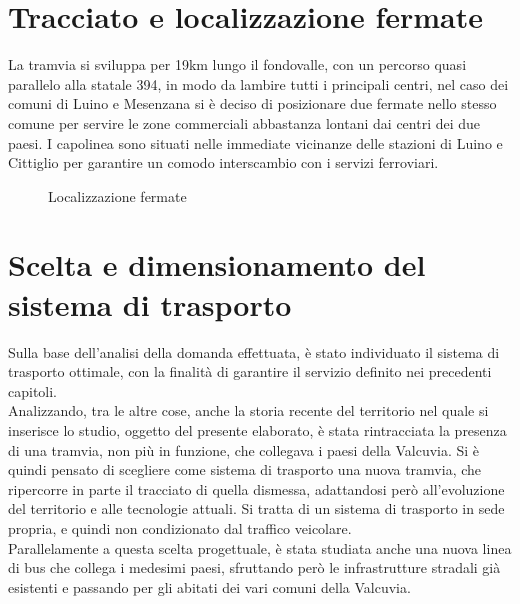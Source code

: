 \documentclass{article}
\begin{document}
\section{Tracciato e localizzazione fermate}
La tramvia si sviluppa per 19km lungo il fondovalle, con un percorso quasi parallelo alla statale 394, in modo da lambire tutti i principali centri, nel caso dei comuni di Luino e Mesenzana si è deciso di posizionare due fermate nello stesso comune per servire le zone commerciali abbastanza lontani dai centri dei due paesi. I capolinea sono situati nelle immediate vicinanze delle stazioni di Luino e Cittiglio per garantire un comodo interscambio con i servizi ferroviari.\\
\begin{figure}[H]
\centering
{}
\qquad
{}
\caption{Localizzazione fermate}
\end{figure}
\newpage
\section{Scelta e dimensionamento del sistema di trasporto}
Sulla base dell’analisi della domanda effettuata, è stato individuato il sistema di trasporto ottimale, con la finalità di garantire il servizio definito nei precedenti capitoli.\\
Analizzando, tra le altre cose, anche la storia recente del territorio nel quale si inserisce lo studio, oggetto del presente elaborato, è stata rintracciata la presenza di una tramvia, non più in funzione, che collegava i paesi della Valcuvia. Si è quindi pensato di scegliere come sistema di trasporto una nuova tramvia, che ripercorre in parte il tracciato di quella dismessa, adattandosi però all’evoluzione del territorio e alle tecnologie attuali. Si tratta di un sistema di trasporto in sede propria, e quindi non condizionato dal traffico veicolare.\\ 
Parallelamente a questa scelta progettuale, è stata studiata anche una nuova linea di bus che collega i medesimi paesi, sfruttando però le infrastrutture stradali già esistenti e passando per gli abitati dei vari comuni della Valcuvia.  
\end{document}
